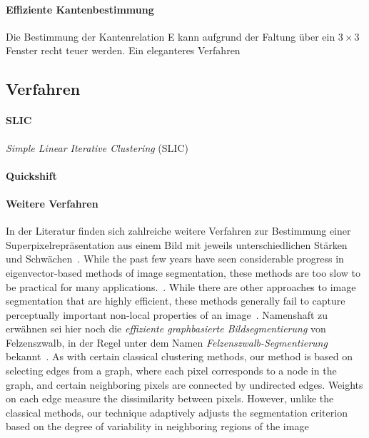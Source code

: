 \paragraph{Effiziente Kantenbestimmung}
\label{kantenbestimmung}

Die Bestimmung der Kantenrelation \gls{E} kann aufgrund der Faltung über ein $3 \times 3$ Fenster recht teuer werden.
Ein eleganteres Verfahren


\subsection{Verfahren}
\label{superpixel_verfahren}

\paragraph{SLIC}
\label{slic}

\cite{slic}

\emph{Simple Linear Iterative Clustering} (SLIC)

\paragraph{Quickshift}
\label{quickshift}

\cite{quickshift}

\paragraph{Weitere Verfahren}
\label{weitere_superpixel_verfahren}

In der Literatur finden sich zahlreiche weitere Verfahren zur Bestimmung einer Superpixelrepräsentation aus einem Bild mit jeweils unterschiedlichen Stärken und Schwächen~\cite{super, super2}.
While the past few years have seen considerable progress in eigenvector-based
methods of image segmentation, these methods are too slow to be
practical for many applications.~\cite{felzenszwalb}.
While there are other approaches to image segmentation that are highly efficient, these
methods generally fail to capture perceptually important non-local properties of an
image~\cite{felzenszwalb}.
Namenshaft zu erwähnen sei hier noch die \emph{effiziente graphbasierte Bildsegmentierung} von Felzenszwalb, in der Regel unter dem Namen \emph{Felzenszwalb-Segmentierung} bekannt~\cite{felzenszwalb}.
As with certain classical clustering methods, our method is based on
selecting edges from a graph, where each pixel corresponds to a node in the graph,
and certain neighboring pixels are connected by undirected edges. Weights on each
edge measure the dissimilarity between pixels. However, unlike the classical methods,
our technique adaptively adjusts the segmentation criterion based on the degree of
variability in neighboring regions of the image~\cite{felzenszwalb}

